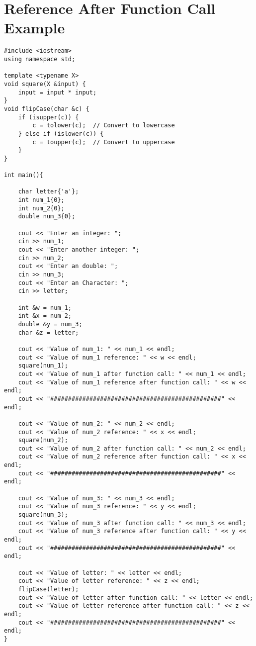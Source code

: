 \documentclass[12pt]{article}
\begin{document}
\section*{Reference After Function Call Example}
\begin{verbatim}
#include <iostream>
using namespace std;

template <typename X>
void square(X &input) {
    input = input * input;
}
void flipCase(char &c) {
    if (isupper(c)) {
        c = tolower(c);  // Convert to lowercase
    } else if (islower(c)) {
        c = toupper(c);  // Convert to uppercase
    }
}

int main(){

    char letter{'a'};
    int num_1{0};
    int num_2{0};
    double num_3{0};

    cout << "Enter an integer: ";
    cin >> num_1;
    cout << "Enter another integer: ";
    cin >> num_2;
    cout << "Enter an double: ";
    cin >> num_3;
    cout << "Enter an Character: ";
    cin >> letter;

    int &w = num_1;
    int &x = num_2;
    double &y = num_3;
    char &z = letter;

    cout << "Value of num_1: " << num_1 << endl;
    cout << "Value of num_1 reference: " << w << endl;
    square(num_1);
    cout << "Value of num_1 after function call: " << num_1 << endl;
    cout << "Value of num_1 reference after function call: " << w << endl;
    cout << "################################################" << endl;

    cout << "Value of num_2: " << num_2 << endl; 
    cout << "Value of num_2 reference: " << x << endl;
    square(num_2);
    cout << "Value of num_2 after function call: " << num_2 << endl;
    cout << "Value of num_2 reference after function call: " << x << endl;
    cout << "################################################" << endl;

    cout << "Value of num_3: " << num_3 << endl; 
    cout << "Value of num_3 reference: " << y << endl;
    square(num_3);
    cout << "Value of num_3 after function call: " << num_3 << endl; 
    cout << "Value of num_3 reference after function call: " << y << endl;
    cout << "################################################" << endl;

    cout << "Value of letter: " << letter << endl; 
    cout << "Value of letter reference: " << z << endl;
    flipCase(letter);
    cout << "Value of letter after function call: " << letter << endl; 
    cout << "Value of letter reference after function call: " << z << endl;
    cout << "################################################" << endl;
}
\end{verbatim}
\end{document}
